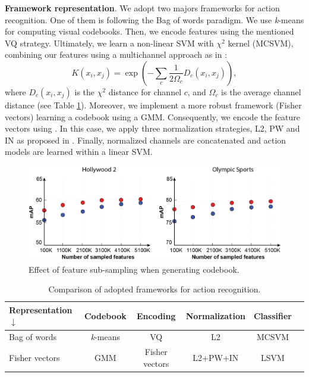 \textbf{Framework representation}. We adopt two majors frameworks for action recognition. One of them is following the Bag of words paradigm. We use \textit{k}-means for computing visual codebooks. Then, we encode features using the mentioned VQ strategy. Ultimately, we learn a non-linear SVM with $\chi^2$ kernel (MCSVM), combining our features using a multichannel approach as in \cite{zhang2007}:
\begin{equation}
K(x_i,x_j)= \exp(-\sum_c {\frac{1}{2\Omega_c} D_c(x_i,x_j)}),
\label{eq:multichannel}
\end{equation}
where $D_c(x_i,x_j)$ is the $\chi^2$ distance for channel $c$, and $\Omega_c$ is the average channel distance (see Table \ref{tab:frameworks}). Moreover, we implement a more robust framework (Fisher vectors) learning a codebook using a GMM. Consequently, we encode the feature vectors using \cite{perronnin2010}. In this case, we apply three normalization strategies, L2, PW and IN as proposed in \cite{xwang2013}. Finally, normalized channels are concatenated and action models are learned within a linear SVM.

\begin{figure}[t!]
\begin{center}
\includegraphics[width=0.98\linewidth]{fig/sampling.png}
\end{center}
\caption{Effect of feature sub-sampling when generating codebook.}
\label{fig:feature_sampling}
\end{figure}

\begin{table}[h!]
\caption{Comparison of adopted frameworks for action recognition.}
\begin{center}
{
\begin{tabular}{ l| c c c c c }
\hline
Representation $\downarrow$ & Codebook & Encoding & Normalization & Classifier \\
\hline
Bag of words & \textit{k}-means & VQ & L2 & MCSVM \\
Fisher vectors & GMM & Fisher vectors & L2+PW+IN & LSVM \\
\hline
\end{tabular}
}
\end{center}
\label{tab:frameworks}
\end{table}

